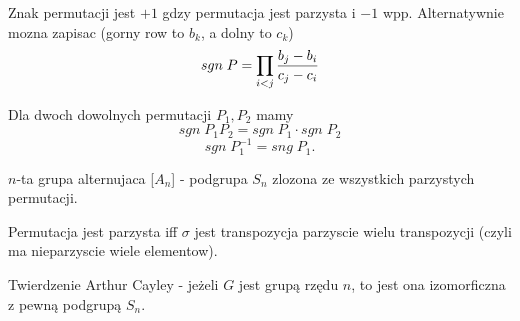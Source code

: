 \begin{multicols}{2}
    {\color{def}Znak permutacji} jest $+1$ gdzy permutacja jest parzysta i $-1$ wpp. Alternatywnie mozna zapisac (gorny row to $b_k$, a dolny to $c_k$)
    $$sgn\;P=\prod_{i<j}{b_j-b_i\over c_j-c_i}$$

    Dla dwoch dowolnych permutacji $P_1,P_2$ mamy
    $$sgn\;P_1P_2=sgn\;P_1\cdot sgn\;P_2$$
    $$sgn\;P_1^{-1}=sng\;P_1.$$

    {\color{def}$n$-ta grupa alternujaca} [$A_n$] - podgrupa $S_n$ zlozona ze wszystkich parzystych permutacji.

    \medskip

    Permutacja jest parzysta iff $\sigma$ jest transpozycja parzyscie wielu transpozycji (czyli ma nieparzyscie wiele elementow).
    \medskip

    {\color{def}Twierdzenie Arthur Cayley} - jeżeli $G$ jest grupą rzędu $n$, to jest ona izomorficzna z pewną podgrupą $S_n$.

\end{multicols}\bigskip